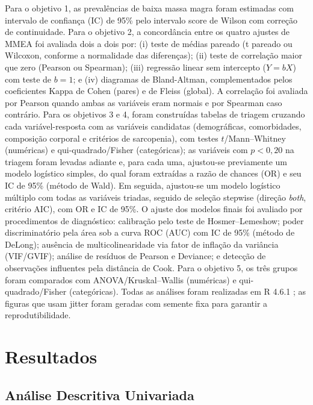 \documentclass[11pt,a4paper]{article}
\begin{document}
Para o objetivo 1, as prevalências de baixa massa magra foram estimadas com
intervalo de confiança (IC) de 95\% pelo intervalo score de Wilson com correção
de continuidade. Para o objetivo 2, a
concordância entre os quatro ajustes de MMEA foi avaliada dois a dois por:
(i) teste de médias pareado (t pareado ou Wilcoxon, conforme a normalidade das
diferenças); (ii) teste de correlação maior que zero (Pearson ou Spearman);
(iii) regressão linear sem intercepto ($Y = bX$) com teste de $b = 1$; e
(iv) diagramas de Bland-Altman, complementados pelos coeficientes Kappa de
Cohen (pares) e de Fleiss (global). A correlação foi avaliada por Pearson quando
ambas as variáveis eram normais e por Spearman caso contrário. Para os objetivos
3 e 4, foram construídas
tabelas de triagem cruzando cada variável-resposta com as variáveis candidatas
(demográficas, comorbidades, composição corporal e critérios de sarcopenia),
com testes $t$/Mann--Whitney (numéricas) e qui-quadrado/Fisher (categóricas);
as variáveis com $p < 0{,}20$ na triagem foram levadas adiante e, para cada uma,
ajustou-se previamente um modelo logístico simples, do qual
foram extraídas a razão de chances (OR) e seu IC de 95\% (método de Wald). Em
seguida, ajustou-se um modelo logístico múltiplo com todas as variáveis
triadas, seguido de seleção stepwise (direção \textit{both}, critério AIC), com
OR e IC de 95\%. O ajuste dos modelos finais foi avaliado por procedimentos de
diagnóstico: calibração pelo teste de Hosmer--Lemeshow; poder discriminatório
pela área sob a curva ROC (AUC) com IC de 95\% (método de DeLong); ausência de
multicolinearidade via fator de inflação da variância (VIF/GVIF); análise de
resíduos de Pearson e Deviance; e detecção de observações influentes pela
distância de Cook. Para o objetivo 5, os três grupos foram comparados
com ANOVA/Kruskal--Wallis (numéricas) e qui-quadrado/Fisher (categóricas).
Todas as análises foram realizadas em R 4.6.1 \cite{r2026}; as figuras que usam
jitter foram geradas com semente fixa para garantir a reprodutibilidade.

\section{Resultados}
\label{sec:resultados}

\subsection{Análise Descritiva Univariada}
\end{document}
